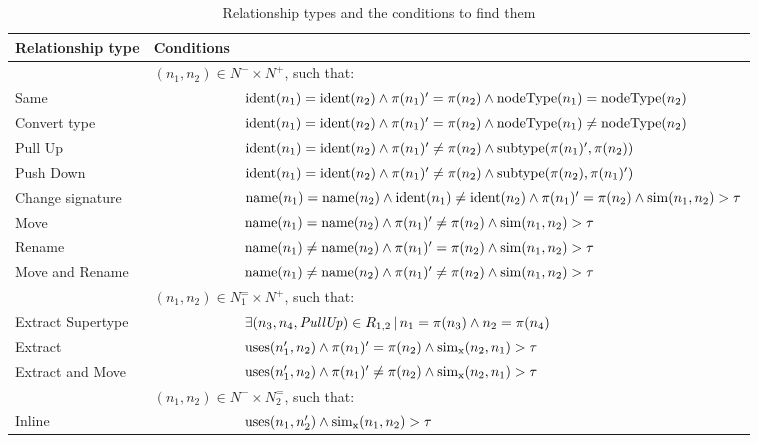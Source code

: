 \begin{table}[htbp]
\renewcommand{\arraystretch}{1.3}
\caption{Relationship types and the conditions to find them}
\label{TabRelationshipTypes}
\centering

\begin{tabular}{@{}lll@{}}
\toprule
Relationship type & Conditions \\
\midrule
& \multicolumn{2}{l}{$(n_1, n_2) \in N^- \times N^+$, such that:}\\
Same & & $\operatorname{ident}(n_1) = \operatorname{ident}(n_2) \land \operatorname{\pi}(n_1)' = \operatorname{\pi}(n_2) \land \operatorname{nodeType}(n_1) = \operatorname{nodeType}(n_2)$ \\
Convert type & & $\operatorname{ident}(n_1) = \operatorname{ident}(n_2) \land \operatorname{\pi}(n_1)' = \operatorname{\pi}(n_2) \land \operatorname{nodeType}(n_1) \neq \operatorname{nodeType}(n_2)$ \\
Pull Up & & $\operatorname{ident}(n_1) = \operatorname{ident}(n_2) \land \operatorname{\pi}(n_1)' \neq \operatorname{\pi}(n_2) \land \operatorname{subtype}(\operatorname{\pi}(n_1)', \operatorname{\pi}(n_2))$ \\
Push Down & & $\operatorname{ident}(n_1) = \operatorname{ident}(n_2) \land \operatorname{\pi}(n_1)' \neq \operatorname{\pi}(n_2) \land \operatorname{subtype}(\operatorname{\pi}(n_2), \operatorname{\pi}(n_1)')$ \\
Change signature & & $\operatorname{name}(n_1) = \operatorname{name}(n_2) \land \operatorname{ident}(n_1) \neq \operatorname{ident}(n_2) \land \operatorname{\pi}(n_1)' = \operatorname{\pi}(n_2) \land \operatorname{sim}(n_1, n_2) > \tau$ \\
Move & & $\operatorname{name}(n_1) = \operatorname{name}(n_2) \land \operatorname{\pi}(n_1)' \neq \operatorname{\pi}(n_2) \land \operatorname{sim}(n_1, n_2) > \tau$ \\
Rename & & $\operatorname{name}(n_1) \neq \operatorname{name}(n_2) \land \operatorname{\pi}(n_1)' = \operatorname{\pi}(n_2) \land \operatorname{sim}(n_1, n_2) > \tau$ \\
Move and Rename & & $\operatorname{name}(n_1) \neq \operatorname{name}(n_2) \land \operatorname{\pi}(n_1)' \neq \operatorname{\pi}(n_2) \land \operatorname{sim}(n_1, n_2) > \tau$ \\
\addlinespace
& \multicolumn{2}{l}{$(n_1, n_2) \in N_1^= \times N^+$, such that:}\\
Extract Supertype & & $\exists (n_3, n_4, \mathit{PullUp}) \in R_{1,2}\,|\,n_1 = \operatorname{\pi}(n_3) \land n_2 = \operatorname{\pi}(n_4)$ \\
Extract & & $\operatorname{uses}(n_1', n_2) \land \operatorname{\pi}(n_1)' = \operatorname{\pi}(n_2) \land \operatorname{sim_{x}}(n_2, n_1) > \tau$ \\
Extract and Move & & $\operatorname{uses}(n_1', n_2) \land \operatorname{\pi}(n_1)' \neq \operatorname{\pi}(n_2) \land \operatorname{sim_{x}}(n_2, n_1) > \tau$ \\
\addlinespace
& \multicolumn{2}{l}{$(n_1, n_2) \in N^- \times N_2^=$, such that:}\\
Inline & & $\operatorname{uses}(n_1, n_2') \land \operatorname{sim_{x}}(n_1, n_2) > \tau$ \\
\bottomrule
\end{tabular}


\end{table}
